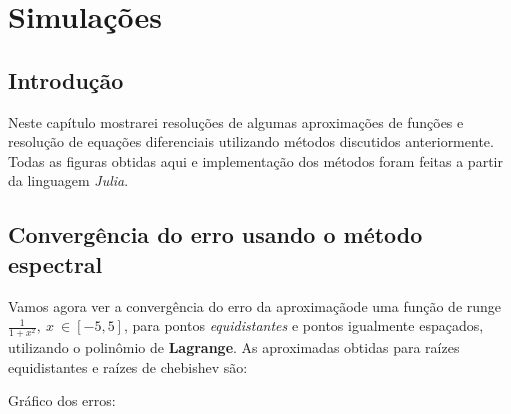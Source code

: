 \chapter{Simulações}
\label{cap:III}
\section{Introdução}
 Neste capítulo mostrarei resoluções de algumas aproximações de funções e resolução de equações diferenciais utilizando métodos discutidos anteriormente. Todas as figuras obtidas aqui e implementação dos métodos foram feitas a partir da linguagem \emph{Julia}.

\section{Convergência do erro usando o método espectral}
	Vamos agora ver a convergência do erro da aproximaçãode uma função de runge $\frac{1}{1+x^2},\ x\ \in [-5,5]$, para pontos \emph{equidistantes} e pontos igualmente espaçados, utilizando o polinômio de \textbf{Lagrange}.
	As aproximadas obtidas para raízes equidistantes e raízes de chebishev são:
	
	Gráfico dos erros:
	

